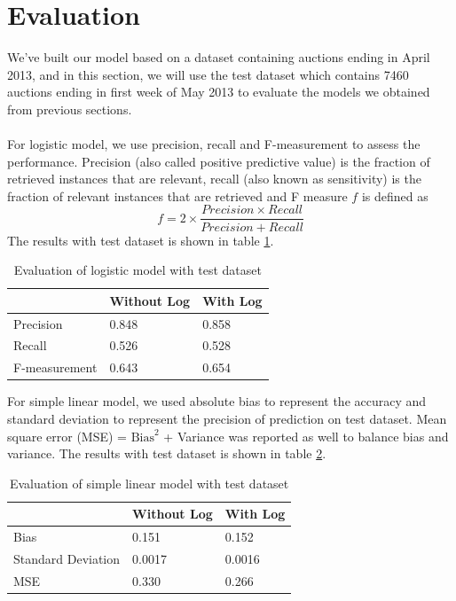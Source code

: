 \documentclass[CEJM,PDF]{cej} %
\begin{document}
\section{Evaluation}
We've built our model based on a dataset containing auctions ending in April 2013, and in this section, we will use the test dataset which contains 7460 auctions ending in first week of May 2013 to evaluate the models we obtained from previous sections. \\
\\
For logistic model, we use precision, recall and F-measurement to assess the performance. Precision (also called positive predictive value) is the fraction of retrieved instances that are relevant, recall (also known as sensitivity) is the fraction of relevant instances that are retrieved and F measure $f$ is defined as 
$$f=2\times\frac{Precision\times Recall}{Precision+Recall}$$
The results with test dataset is shown in table \ref{logit}.

\begin{table}[h]
\centering
\caption{Evaluation of logistic model with test dataset}
\label{logit}
\begin{tabular}{@{}|l|l|l|@{}}
\toprule
\hline
  & Without Log & With Log \\
\hline
Precision  & 0.848 & 0.858 \\ \midrule
\hline
Recall  & 0.526 & 0.528  \\
\hline
F-measurement  &  0.643 & 0.654\\ \bottomrule
\hline
\end{tabular}
\end{table}


For simple linear model, we used absolute bias to represent the accuracy and standard deviation to represent the precision of prediction on test dataset. Mean square error (MSE) = $\text{Bias}^2$ + Variance was reported as well to balance bias and variance. The results with test dataset is shown in table \ref{lm}.

\begin{table}[h]
\centering
\caption{Evaluation of simple linear model with test dataset}
\label{lm}
\begin{tabular}{@{}|l|l|l|@{}}
\toprule
\hline
  & Without Log & With Log \\
\hline
Bias  & 0.151  & 0.152 \\ \midrule
\hline
Standard Deviation  &  0.0017 & 0.0016  \\
\hline
MSE  &  0.330  & 0.266\\ \bottomrule
\hline
\end{tabular}
\end{table}
\end{document}
